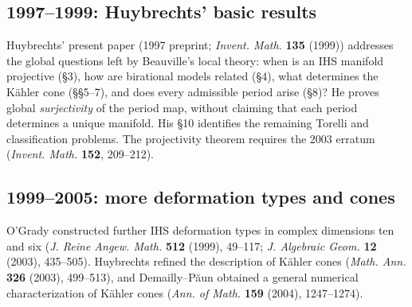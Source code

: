 \documentclass[11pt]{article}
\begin{document}
\subsection{1997--1999: Huybrechts' basic results}
Huybrechts' present paper (1997 preprint;
\emph{Invent. Math.} \textbf{135} (1999))
addresses the global questions left by
Beauville's local theory: when is an IHS
manifold projective (\S3), how are birational
models related (\S4), what determines the
K\"ahler cone (\S\S5--7), and does every
admissible period arise (\S8)?
He proves global \emph{surjectivity} of
the period map, without claiming that
each period determines a unique manifold.
His \S10 identifies the remaining Torelli
and classification problems.
The projectivity theorem requires the
2003 erratum (\emph{Invent. Math.}
\textbf{152}, 209--212).

\subsection{1999--2005: more deformation types and cones}
O'Grady constructed further IHS deformation
types in complex dimensions ten and six
(\emph{J. Reine Angew. Math.} \textbf{512}
(1999), 49--117; \emph{J. Algebraic Geom.}
\textbf{12} (2003), 435--505).
Huybrechts refined the description of
K\"ahler cones (\emph{Math. Ann.}
\textbf{326} (2003), 499--513), and
Demailly--P\u{a}un obtained a general
numerical characterization of K\"ahler
cones (\emph{Ann. of Math.} \textbf{159}
(2004), 1247--1274).
\end{document}
